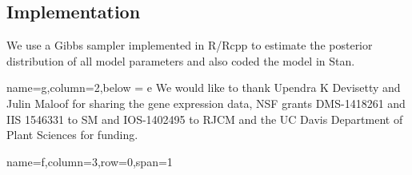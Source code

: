 \documentclass[landscape,paperwidth=48in,paperheight=36in,fontscale=0.35]{baposter}
\begin{document}
\begin{poster}
{\subsection*{Implementation}
We use a Gibbs sampler implemented in R/Rcpp to estimate the posterior distribution of all model parameters and also coded the model in Stan\citep{Carpenter:2015}.

}

 {name=g,column=2,below = e}{
We would like to thank Upendra K Devisetty and Julin Maloof for sharing the gene expression data, NSF grants DMS-1418261 and IIS 1546331 to SM and IOS-1402495 to RJCM and the UC Davis Department of Plant Sciences for funding.
}

 {name=f,column=3,row=0,span=1}{
\begin{multicols}{2}

\end{multicols}}
\end{poster}
\end{document}
